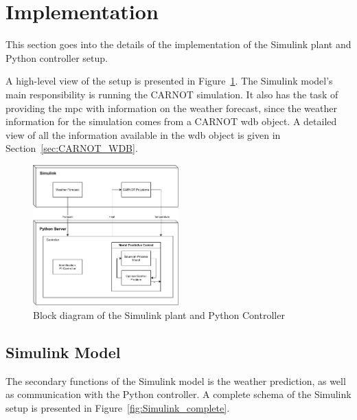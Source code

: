 \section{Implementation}\label{sec:implementation}

This section goes into the details of the implementation of the Simulink plant
and Python controller setup.

A high-level view of the setup is presented in Figure~\ref{fig:setup_diagram}.
The Simulink model's main responsibility is running the CARNOT simulation. It
also has the task of providing the \acrshort{mpc} with information on the
weather forecast, since the weather information for the simulation comes from a
CARNOT \acrshort{wdb} object. A detailed view of all the information available
in the \acrshort{wdb} object is given in Section~\ref{sec:CARNOT_WDB}.


\begin{figure}[ht]
    \centering
    \includegraphics[width = 0.5\textwidth]{Images/setup_diagram.pdf}
    \caption{Block diagram of the Simulink plant and Python Controller}
    \label{fig:setup_diagram}
\end{figure}

\subsection{Simulink Model}

The secondary functions of the Simulink model is the weather prediction, as well
as communication with the Python controller. A complete schema of the Simulink
setup is presented in Figure~\ref{fig:Simulink_complete}.

